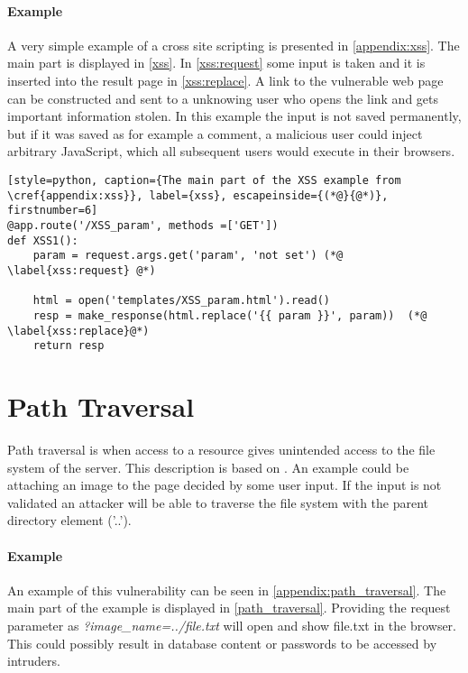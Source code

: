 \paragraph{Example}
A very simple example of a cross site scripting is presented in \cref{appendix:xss}.
The main part is displayed in \cref{xss}.
In \cref{xss:request} some input is taken and it is inserted into the result page in \cref{xss:replace}.
A link to the vulnerable web page can be constructed and sent to a unknowing user who opens the link and gets important information stolen.
In this example the input is not saved permanently, but if it was saved as for example a comment, a malicious user could inject arbitrary JavaScript, which all subsequent users would execute in their browsers.

\begin{lstlisting}[style=python, caption={The main part of the XSS example from \cref{appendix:xss}}, label={xss}, escapeinside={(*@}{@*)}, firstnumber=6]
@app.route('/XSS_param', methods =['GET'])
def XSS1():
    param = request.args.get('param', 'not set') (*@ \label{xss:request} @*)

    html = open('templates/XSS_param.html').read()
    resp = make_response(html.replace('{{ param }}', param))  (*@ \label{xss:replace}@*)
    return resp
\end{lstlisting}

\section{Path Traversal}\label{vulnerabilities:traversal}
Path traversal is when access to a resource gives unintended access to the file system of the server.
This description is based on \citet{pathtraversal}.
An example could be attaching an image to the page decided by some user input.
If the input is not validated an attacker will be able to traverse the file system with the parent directory element ('..'). 

\paragraph{Example}
An example of this vulnerability can be seen in \cref{appendix:path_traversal}.
The main part of the example is displayed in \cref{path_traversal}.
Providing the request parameter as \emph{?image\_name=../file.txt} will open and show file.txt in the browser.
This could possibly result in database content or passwords to be accessed by intruders.

